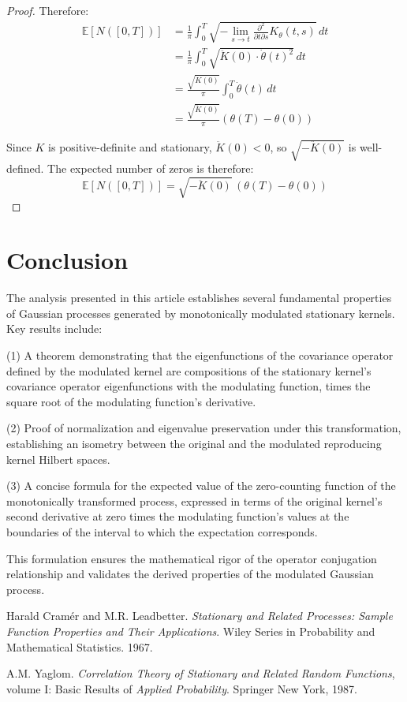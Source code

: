 \documentclass{article}
\newcommand{\EE}{\mathbb{E}}
\newcommand{\dottheta}{\dot{\theta}}
\begin{document}
\begin{proof}
Therefore:
\begin{align}
\EE[N([0,T])] &= \frac{1}{\pi}\int_0^T \sqrt{-\lim_{s\to t} \frac{\partial^2}{\partial t \partial s} K_\theta(t,s)} \, dt\\
&= \frac{1}{\pi}\int_0^T \sqrt{\ddot{K}(0) \cdot \dottheta(t)^2} \, dt\\
&= \frac{\sqrt{\ddot{K}(0)}}{\pi} \int_0^T \dottheta(t) \, dt\\
&= \frac{\sqrt{\ddot{K}(0)}}{\pi} (\theta(T) - \theta(0))
\end{align}

Since $K$ is positive-definite and stationary, $\ddot{K}(0) < 0$, so $\sqrt{-\ddot{K}(0)}$ is well-defined. The expected number of zeros is therefore:
\begin{equation}
\EE[N([0,T])] = \sqrt{-\ddot{K}(0)} \, (\theta(T)-\theta(0))
\end{equation}
\end{proof}

\section{Conclusion}

The analysis presented in this article establishes several fundamental properties of Gaussian processes generated by monotonically modulated stationary kernels. Key results include: 

(1) A theorem demonstrating that the eigenfunctions of the covariance operator defined by the modulated kernel are compositions of the stationary kernel's covariance operator eigenfunctions with the modulating function, times the square root of the modulating function's derivative.

(2) Proof of normalization and eigenvalue preservation under this transformation, establishing an isometry between the original and the modulated reproducing kernel Hilbert spaces.

(3) A concise formula for the expected value of the zero-counting function of the monotonically transformed process, expressed in terms of the original kernel's second derivative at zero times the modulating function's values at the boundaries of the interval to which the expectation corresponds.

This formulation ensures the mathematical rigor of the operator conjugation relationship and validates the derived properties of the modulated Gaussian process.

\begin{thebibliography}{99}

Harald Cramér and M.R. Leadbetter. \textit{Stationary and Related Processes: Sample Function Properties and Their Applications}. Wiley Series in Probability and Mathematical Statistics. 1967.

A.M. Yaglom. \textit{Correlation Theory of Stationary and Related Random Functions}, volume I: Basic Results of \textit{Applied Probability}. Springer New York, 1987.

\end{thebibliography}
\end{document}
